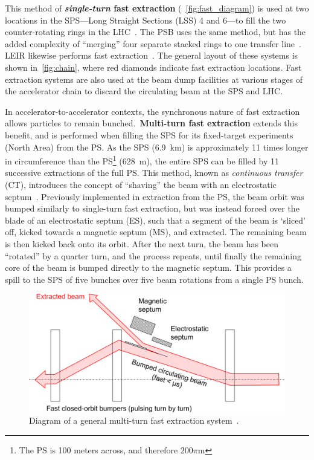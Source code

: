 \documentclass[a4paper,twoside,11pt]{report}
\begin{document}
This method of \textbf{\textit{single-turn} fast extraction} (~\autoref{fig:fast_diagram}) is used at two locations in the SPS---Long Straight Sections (LSS) 4 and 6---to fill the two counter-rotating rings in the LHC~\cite{Fraser:CAS}. The PSB uses the same method, but has the added complexity of ``merging'' four separate stacked rings to one transfer line~\cite{Metzmacher:2061508}. LEIR likewise performs fast extraction~\cite{Ghithan:2017wpd}. The general layout of these systems is shown in~\ref{fig:chain}, where red diamonds indicate fast extraction locations. Fast extraction systems are also used at the beam dump facilities at various stages of the accelerator chain to discard the circulating beam at the SPS and LHC.

In accelerator-to-accelerator contexts, the synchronous nature of fast extraction allows particles to remain bunched.~\textbf{Multi-turn fast extraction} extends this benefit, and is performed when filling the SPS for its fixed-target experiments (North Area) from the PS. As the SPS (\qty{6.9}{km}) is approximately 11 times longer in circumference than the PS\footnote{The PS is 100 meters across, and therefore $200\pi$\si{m}} (\qty{628}{m}), the entire SPS can be filled by 11 successive extractions of the full PS. This method, known as \textit{continuous transfer} (CT), introduces the concept of ``shaving'' the beam with an electrostatic septum~\cite{PhysRevSTAB.14.030101}. Previously implemented in extraction from the PS, the beam orbit was bumped similarly to single-turn fast extraction, but was instead forced over the blade of an electrostatic septum (ES), such that a segment of the beam is `sliced' off, kicked towards a magnetic septum (MS), and extracted. The remaining beam is then kicked back onto its orbit. After the next turn, the beam has been ``rotated'' by a quarter turn, and the process repeats, until finally the remaining core of the beam is bumped directly to the magnetic septum. This provides a spill to the SPS of five bunches over five beam rotations from a single PS bunch.

\begin{figure}[hb]
  \centering
  \includegraphics[width=\linewidth]{fastmulti.png}
  \caption{Diagram of a general multi-turn fast extraction system~\cite{Fraser:CAS}.}\label{fig:fast_multi_diagram}
\end{figure}
\end{document}
